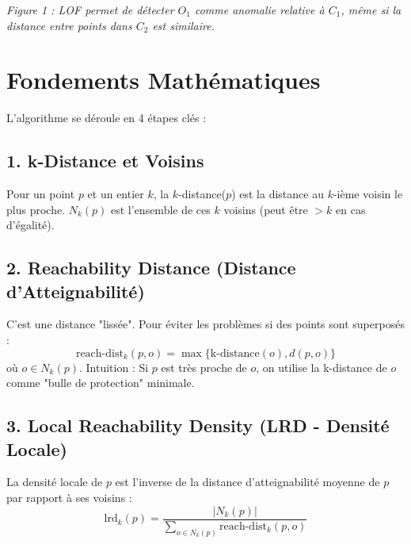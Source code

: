 \documentclass[a4paper,11pt]{article}
\begin{document}
\begin{center}

\textit{Figure 1 : LOF permet de détecter $O_1$ comme anomalie relative à $C_1$, même si la distance entre points dans $C_2$ est similaire.}
\end{center}

\section{Fondements Mathématiques}

L'algorithme se déroule en 4 étapes clés :

\subsection{1. k-Distance et Voisins}
Pour un point $p$ et un entier $k$, la $k$-distance($p$) est la distance au $k$-ième voisin le plus proche.
$N_k(p)$ est l'ensemble de ces $k$ voisins (peut être $>k$ en cas d'égalité).

\subsection{2. Reachability Distance (Distance d'Atteignabilité)}
C'est une distance "lissée". Pour éviter les problèmes si des points sont superposés :
$$ \text{reach-dist}_k(p, o) = \max\{ \text{k-distance}(o), d(p, o) \} $$
où $o \in N_k(p)$.
Intuition : Si $p$ est très proche de $o$, on utilise la k-distance de $o$ comme "bulle de protection" minimale.

\subsection{3. Local Reachability Density (LRD - Densité Locale)}
La densité locale de $p$ est l'inverse de la distance d'atteignabilité moyenne de $p$ par rapport à ses voisins :
$$ \text{lrd}_k(p) = \frac{|N_k(p)|}{\sum_{o \in N_k(p)} \text{reach-dist}_k(p, o)} $$
\end{document}
